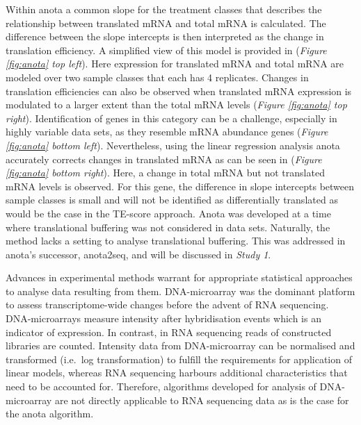 \documentclass[12pt,openany]{book}
\begin{document}
Within anota a common slope for the treatment classes that describes the
relationship between translated mRNA and total mRNA is calculated. The
difference between the slope intercepts is then interpreted as the
change in translation efficiency. A simplified view of this model is
provided in (\emph{Figure \ref{fig:anota} top left}). Here expression
for translated mRNA and total mRNA are modeled over two sample classes
that each has 4 replicates. Changes in translation efficiencies can also
be observed when translated mRNA expression is modulated to a larger
extent than the total mRNA levels (\emph{Figure \ref{fig:anota} top
right}). Identification of genes in this category can be a challenge,
especially in highly variable data sets, as they resemble mRNA abundance
genes (\emph{Figure \ref{fig:anota} bottom left}). Nevertheless, using
the linear regression analysis anota accurately corrects changes in
translated mRNA as can be seen in (\emph{Figure \ref{fig:anota} bottom
right}). Here, a change in total mRNA but not translated mRNA levels is
observed. For this gene, the difference in slope intercepts between
sample classes is small and will not be identified as differentially
translated as would be the case in the TE-score approach. Anota was
developed at a time where translational buffering was not considered in
data sets. Naturally, the method lacks a setting to analyse
translational buffering. This was addressed in anota's successor,
anota2seq, and will be discussed in \emph{Study 1}.

Advances in experimental methods warrant for appropriate statistical
approaches to analyse data resulting from them. DNA-microarray was the
dominant platform to assess transcriptome-wide changes before the advent
of RNA sequencing. DNA-microarrays measure intensity after hybridisation
events which is an indicator of expression. In contrast, in RNA
sequencing reads of constructed libraries are counted. Intensity data
from DNA-microarray can be normalised and transformed (i.e.~log
transformation) to fulfill the requirements for application of linear
models, whereas RNA sequencing harbours additional characteristics that
need to be accounted for. Therefore, algorithms developed for analysis
of DNA- microarray are not directly applicable to RNA sequencing data as
is the case for the anota algorithm.
\end{document}
